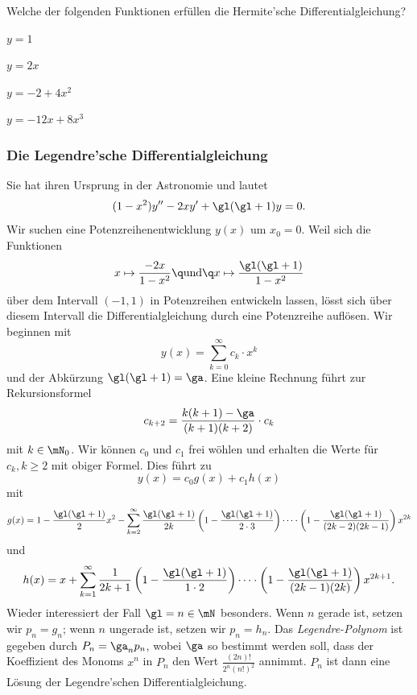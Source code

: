 \documentclass[%
11pt,%
twoside,%
titlepage,%
german,%
headsepline%
]{scrartcl}
\begin{document}
\begin{ueb}
Welche der folgenden Funktionen erf\"ullen die Hermite'sche Differentialgleichung?

\begin{minipage}{0.3\textwidth}
\begin{enumeratea}
\item $y=1$
\item $y=2x$
\end{enumeratea}
\end{minipage}
\begin{minipage}{0.4\textwidth}
\begin{enumeratea}
\setcounter{enumi}{2}
\item $y=-2+4x^2$
\item $y=-12x+8x^3$
\end{enumeratea}
\end{minipage}
\end{ueb}

\subsubsection{Die Legendre'sche Differentialgleichung}

Sie hat ihren Ursprung in der Astronomie und lautet
\begin{equation}\label{eq:legendre}
(1-x^2)y''-2xy'+\gl(\gl+1)y=0.
\end{equation}
Wir suchen eine Potenzreihenentwicklung $y(x)$ um $x_0=0$. Weil sich die Funktionen
$$x\mapsto\frac{-2x}{1-x^2}\q\text{und}\q x\mapsto\frac{\gl(\gl+1)}{1-x^2}$$
\"uber dem Intervall $(-1,1)$ in Potenzreihen entwickeln lassen, l\"osst sich \"uber diesem Intervall die Differentialgleichung durch eine Potenzreihe aufl\"osen.
Wir beginnen mit
$$y(x)=\sum_{k=0}^\infty c_k\cdot x^k$$
und der Abk\"urzung $\gl(\gl+1)=\ga$. Eine kleine Rechnung f\"uhrt zur Rekursionsformel
$$c_{k+2}=\frac{k(k+1)-\ga}{(k+1)(k+2)}\cdot c_k$$
mit $k\in\mN_0$. Wir k\"onnen $c_0$ und $c_1$ frei w\"ohlen und erhalten die Werte f\"ur $c_k, k\geq2$ mit obiger Formel. Dies f\"uhrt zu
$$y(x)=c_0g(x)+c_1h(x)$$
mit
$$
g(x)=1-\frac{\gl(\gl+1)}{2}x^2
-\sum_{k=2}^\infty\frac{\gl(\gl+1)}{2k}\left(1-\frac{\gl(\gl+1)}{2\cdot3}\right)
\dots \cdot \left(1-\frac{\gl(\gl+1)}{(2k-2)(2k-1)}\right) x^{2k}
$$
und
$$
h(x)=x
+\sum_{k=1}^\infty\frac{1}{2k+1}\left(1-\frac{\gl(\gl+1)}{1\cdot2}\right)
\dots\cdot \left(1-\frac{\gl(\gl+1)}{(2k-1)(2k)}\right) x^{2k+1}.
$$
Wieder interessiert der Fall $\gl=n\in\mN$ besonders. Wenn $n$ gerade ist, setzen wir $p_n=g_n$; wenn $n$ ungerade ist, setzen wir $p_n=h_n$. Das \emph{Legendre-Polynom} ist gegeben durch $P_n=\ga_np_n$, wobei $\ga$ so bestimmt werden soll, dass der Koeffizient des Monoms $x^n$ in $P_n$ den Wert $\frac{(2n)!}{2^n(n!)^2}$ annimmt. $P_n$ ist dann eine L\"osung der Legendre'schen Differentialgleichung.
\end{document}

